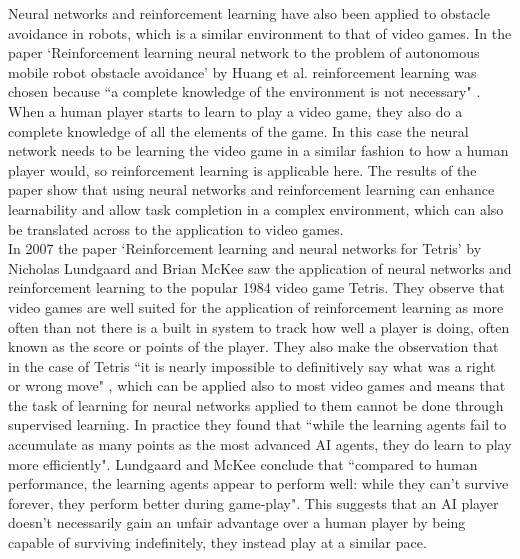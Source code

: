 \documentclass[10pt]{article}
\begin{document}
		Neural networks and reinforcement learning have also been applied to obstacle avoidance in robots, which is a similar environment to that of video games. In the paper `Reinforcement learning neural network to the problem of autonomous mobile robot obstacle avoidance' by Huang et al.  reinforcement learning was chosen because ``a complete knowledge of the environment is not necessary" \cite{rlrobot}. When a human player starts to learn to play a video game, they also do a complete knowledge of all the elements of the game. In this case the neural network needs to be learning the video game in a similar fashion to how a human player would, so reinforcement learning is applicable here. The results of the paper show that using neural networks and reinforcement learning can enhance learnability and allow task completion in a complex environment, which can also be translated across to the application to video games.\\

		In 2007 the paper `Reinforcement learning and neural networks for Tetris' by Nicholas Lundgaard and Brian McKee saw the application of neural networks and reinforcement learning to the popular 1984 video game Tetris. They observe that video games are well suited for the application of reinforcement learning as more often than not there is a built in system to track how well a player is doing, often known as the score or points of the player. They also make the observation that in the case of Tetris ``it is nearly impossible to definitively say what was a right or wrong move" \cite{rlnntetris}, which can be applied also to most video games and means that the task of learning for neural networks applied to them cannot be done through supervised learning. In practice they found that ``while the learning agents fail to accumulate as many points as the most advanced AI agents, they do learn to play more efficiently"\cite{rlnntetris}. Lundgaard and McKee conclude that ``compared to human performance, the learning agents appear to perform well: while they can't survive forever, they perform better during game-play"\cite{rlnntetris}. This suggests that an AI player doesn't necessarily gain an unfair advantage over a human player by being capable of surviving indefinitely, they instead play at a similar pace.\\
		
\end{document}
